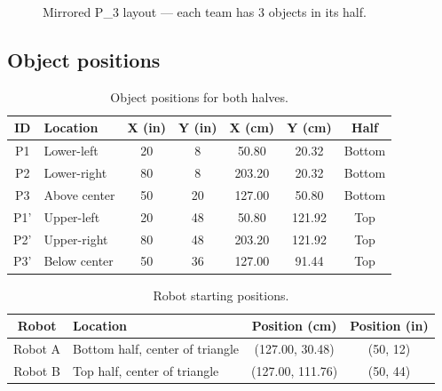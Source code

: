 \documentclass[a4]{article}
\begin{document}
\begin{figure}[H]
\caption{Mirrored P\_3 layout --- each team has 3 objects in its half.}
\end{figure}

\subsection*{Object positions}

\begin{table}[H]
\centering
\begin{tabular}{clccccc}
\toprule
\textbf{ID} & \textbf{Location} & \textbf{X (in)} & \textbf{Y (in)} & \textbf{X (cm)} & \textbf{Y (cm)} & \textbf{Half} \\
\midrule
P1 & Lower-left & 20 & 8 & 50.80 & 20.32 & Bottom \\
P2 & Lower-right & 80 & 8 & 203.20 & 20.32 & Bottom \\
P3 & Above center & 50 & 20 & 127.00 & 50.80 & Bottom \\
\midrule
P1' & Upper-left & 20 & 48 & 50.80 & 121.92 & Top \\
P2' & Upper-right & 80 & 48 & 203.20 & 121.92 & Top \\
P3' & Below center & 50 & 36 & 127.00 & 91.44 & Top \\
\bottomrule
\end{tabular}
\caption{Object positions for both halves.}
\end{table}

\begin{table}[H]
\centering
\begin{tabular}{clcc}
\toprule
\textbf{Robot} & \textbf{Location} & \textbf{Position (cm)} & \textbf{Position (in)} \\
\midrule
Robot A & Bottom half, center of triangle & (127.00, 30.48) & (50, 12) \\
Robot B & Top half, center of triangle & (127.00, 111.76) & (50, 44) \\
\bottomrule
\end{tabular}
\caption{Robot starting positions.}
\end{table}
\end{document}
